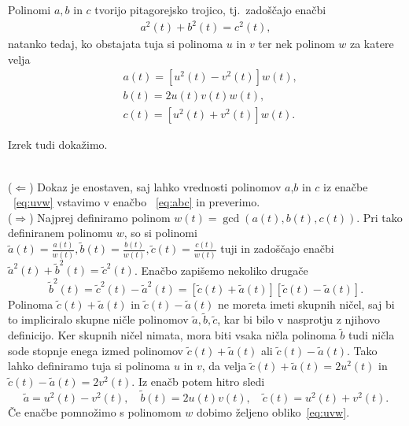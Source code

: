 \documentclass[isrm2, tisk]{fmfdelo}
\begin{document}
    \begin{izrek}              %
        Polinomi $a,b$ in $c$ tvorijo pitagorejsko trojico, tj.\ zadoščajo enačbi
        \vspace{-0.3cm}
        \begin{align}
            a^2(t)+b^2(t)=c^2(t), \label{eq:abc}
        \end{align}
        natanko tedaj, ko obstajata tuja si polinoma $u$ in $v$ ter nek polinom  $w$ za katere velja
        \vspace{-0.3cm}
        \begin{align}
            &a(t)=[u^2(t)-v^2(t)]w(t), \nonumber \\
            &b(t)=2u(t)v(t)w(t),        \nonumber \\
            &c(t)=[u^2(t)+v^2(t)]w(t). \label{eq:uvw}
        \end{align}
    \end{izrek}
    \noindent Izrek tudi dokažimo.
    \begin{dokaz}
        \mbox{}\\
        ($\Leftarrow$) Dokaz je enostaven, saj lahko vrednosti polinomov $a$,$b$ in $c$ iz enačbe ~\eqref{eq:uvw} vstavimo v enačbo ~\eqref{eq:abc} in preverimo. \\
        ($\Rightarrow$) Najprej definiramo polinom $w(t)=\gcd(a(t),b(t),c(t))$.
        Pri tako definiranem polinomu $w$, so si polinomi $\tilde{a}(t)=\frac{a(t)}{w(t)}, \tilde{b}(t)=\frac{b(t)}{w(t)}, \tilde{c}(t)=\frac{c(t)}{w(t)}$ tuji in zadoščajo enačbi $\tilde{a}^2(t)+\tilde{b}^2(t)=\tilde{c}^2(t)$.
        Enačbo zapišemo nekoliko drugače \[\tilde{b}^2(t)= \tilde{c}^2(t)-\tilde{a}^2(t) = [\tilde{c}(t)+\tilde{a}(t)][\tilde{c}(t)-\tilde{a}(t)].\]
        Polinoma $\tilde{c}(t)+\tilde{a}(t)$ in $\tilde{c}(t)-\tilde{a}(t)$ ne moreta imeti skupnih ničel, saj bi to impliciralo skupne ničle polinomov $\tilde{a},\tilde{b},\tilde{c}$, kar bi bilo v nasprotju z njihovo definicijo.
        Ker skupnih ničel nimata, mora biti vsaka ničla polinoma $\tilde{b}$ tudi ničla sode stopnje enega izmed polinomov $\tilde{c}(t)+\tilde{a}(t)$ ali $\tilde{c}(t)-\tilde{a}(t)$.
        Tako lahko definiramo tuja si polinoma $u$ in $v$, da velja $\tilde{c}(t)+\tilde{a}(t)=2u^2(t)$ in $\tilde{c}(t)-\tilde{a}(t)=2v^2(t)$.
        Iz enačb potem hitro sledi \[\tilde{a}=u^2(t)-v^2(t),\quad\tilde{b}(t)=2u(t)v(t), \quad\tilde{c}(t)=u^2(t)+v^2(t).\]
        Če enačbe pomnožimo s polinomom $w$ dobimo željeno obliko~\eqref{eq:uvw}. \qedhere
    \end{dokaz}
\end{document}
